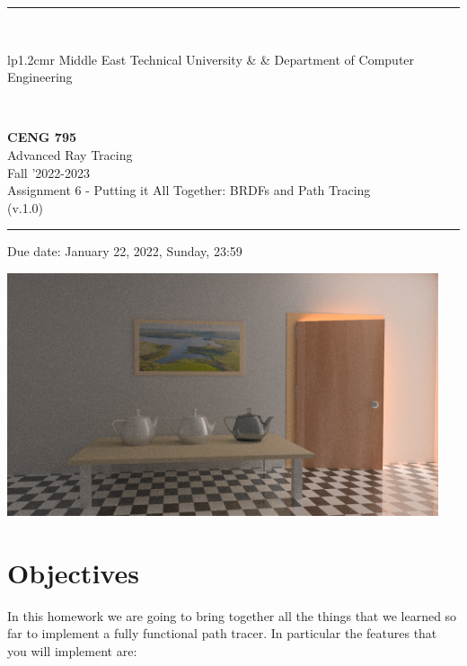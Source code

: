\documentclass[12pt]{article}
\newcommand{\HRule}{\rule{\linewidth}{1mm}}
\begin{document}
\noindent \HRule \\[3mm]
\small
\begin{tabular}[b]{lp{1.2cm}r}
\href{https://www.metu.edu.tr/}{} Middle East Technical
University &  &
\href{https://ceng.metu.edu.tr/information}{} Department of Computer Engineering \\
\end{tabular} \\
\begin{center}

                 \LARGE \textbf{CENG 795} \\[4mm]
                 \Large Advanced Ray Tracing \\[4mm]
                \normalsize Fall '2022-2023 \\
                    \normalsize Assignment 6 - Putting it All Together:
                    BRDFs and Path Tracing\\
                    \normalsize (v.1.0)
\end{center}
\HRule

\begin{center}
Due date: January 22, 2022, Sunday, 23:59
\end{center}

\centerline{
    \includegraphics[width=5in]{../veach-ajar/outputs/VeachAjar_path.png}
}

\section{Objectives}

In this homework we are going to bring together all the things that we
learned so far to implement a fully functional path tracer. In
particular the features that you will implement are:
\end{document}
